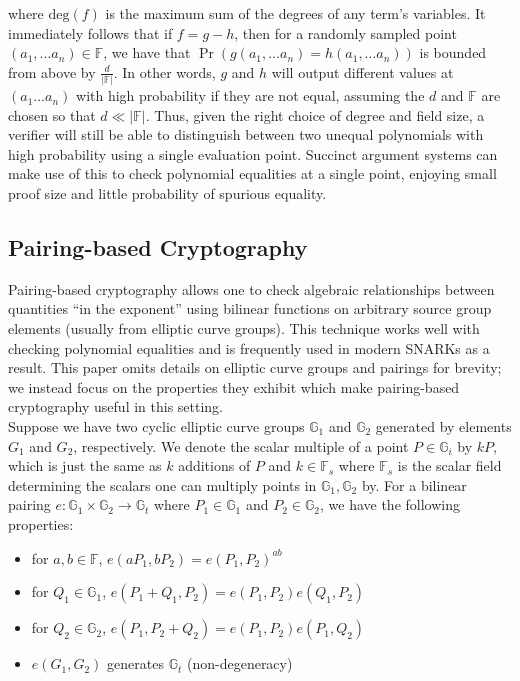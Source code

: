 \noindent where $\text{deg}(f)$ is the maximum sum of the degrees of any term's variables. It immediately follows that if $f = g-h$, then for a randomly sampled point $(a_1, \dots a_n) \in \mathbb{F}$, we have that $\Pr(g(a_1, \dots a_n) = h(a_1, \dots a_n))$ is bounded from above by $\frac{d}{|\mathbb{F}|}$. In other words, $g$ and $h$ will output different values at $(a_1 \dots a_n)$ with high probability if they are not equal, assuming the $d$ and $\mathbb{F}$ are chosen so that $d \ll |\mathbb{F}|$. Thus, given the right choice of degree and field size, a verifier will still be able to distinguish between two unequal polynomials with high probability using a single evaluation point. Succinct argument systems can make use of this to check polynomial equalities at a single point, enjoying small proof size and little probability of spurious equality.

\subsection{Pairing-based Cryptography}
\noindent Pairing-based cryptography \cite{ibepairings} allows one to check algebraic relationships between quantities ``in the exponent'' using bilinear functions on arbitrary source group elements (usually from elliptic curve groups). This technique works well with checking polynomial equalities and is frequently used in modern SNARKs as a result.  This paper omits details on elliptic curve groups and pairings for brevity; we instead focus on the properties they exhibit which make pairing-based cryptography useful in this setting.\\

\noindent Suppose we have two cyclic elliptic curve groups $\mathbb{G}_1$ and $\mathbb{G}_2$ generated by elements $G_1$ and $G_2$, respectively. We denote the scalar multiple of a point $P \in \mathbb{G}_i$ by $kP$, which is just the same as $k$ additions of $P$ and $k \in \mathbb{F}_s$ where $\mathbb{F}_s$ is the scalar field determining the scalars one can multiply points in $\mathbb{G}_1, \mathbb{G}_2$ by. For a bilinear pairing $e: \mathbb{G}_1 \times \mathbb{G}_2 \to \mathbb{G}_t$ where $P_1 \in \mathbb{G}_1$ and $P_2 \in \mathbb{G}_2$, we have the following properties:
\begin{itemize}
    \item for $a, b \in \mathbb{F}$, $e(aP_1, bP_2) = e(P_1, P_2)^{ab}$
    \item for $Q_1 \in \mathbb{G}_1$, $e(P_1+Q_1, P_2) = e(P_1, P_2) e(Q_1, P_2)$
    \item for $Q_2 \in \mathbb{G}_2$, $e(P_1, P_2+Q_2) = e(P_1, P_2) e(P_1, Q_2)$
    \item $e(G_1, G_2)$ generates $\mathbb{G}_t$ (non-degeneracy)
\end{itemize}

